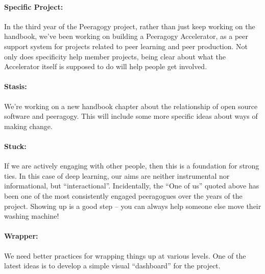 \paragraph{Specific Project:} In the third year of the Peeragogy project, rather than just keep
working on the handbook, we’ve been working on building a Peeragogy
Accelerator, as a peer support system for projects related to peer
learning and peer production. Not only does specificity help member
projects, being clear about what the Accelerator itself is supposed to
do will help people get involved.

\paragraph{Stasis:} We’re working on a new handbook chapter about the relationship of open
source software and peeragogy. This will include some more specific
ideas about ways of making change.

\paragraph{Stuck:} If we are actively engaging with other people, then this is a foundation
for strong ties. In this case of deep learning, our aims are neither
instrumental nor informational, but “interactional”. Incidentally, the
“One of us” quoted above has been one of the most consistently engaged
peeragogues over the years of the project. Showing up is a good step –
you can always help someone else move their washing machine!

\paragraph{Wrapper:}  We need better practices for wrapping things up at
various levels.  One of the latest ideas is to develop a simple visual
``dashboard'' for the project.
